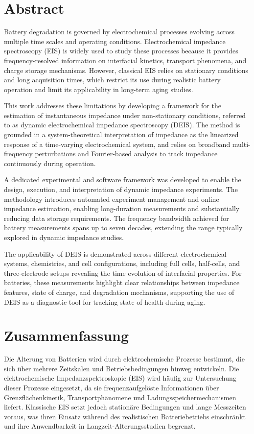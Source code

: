 \chapter*{Abstract}
Battery degradation is governed by electrochemical processes evolving across multiple time scales and operating conditions. Electrochemical impedance spectroscopy (EIS) is widely used to study these processes because it provides frequency-resolved information on interfacial kinetics, transport phenomena, and charge storage mechanisms. However, classical EIS relies on stationary conditions and long acquisition times, which restrict its use during realistic battery operation and limit its applicability in long-term aging studies.

This work addresses these limitations by developing a framework for the estimation of instantaneous impedance under non-stationary conditions, referred to as dynamic electrochemical impedance spectroscopy (DEIS). The method is grounded in a system-theoretical interpretation of impedance as the linearized response of a time-varying electrochemical system, and relies on broadband multi-frequency perturbations and Fourier-based analysis to track impedance continuously during operation.

A dedicated experimental and software framework was developed to enable the design, execution, and interpretation of dynamic impedance experiments. The methodology introduces automated experiment management and online impedance estimation, enabling long-duration measurements and substantially reducing data storage requirements. The frequency bandwidth achieved for battery measurements spans up to seven decades, extending the range typically explored in dynamic impedance studies.

The applicability of DEIS is demonstrated across different electrochemical systems, chemistries, and cell configurations, including full cells, half-cells, and three-electrode setups revealing the time evolution of interfacial properties. For batteries, these measurements highlight clear relationships between impedance features, state of charge, and degradation mechanisms, supporting the use of DEIS as a diagnostic tool for tracking state of health during aging.

\newpage
\chapter*{Zusammenfassung}
Die Alterung von Batterien wird durch elektrochemische Prozesse bestimmt, die sich über mehrere Zeitskalen und Betriebsbedingungen hinweg entwickeln. Die elektrochemische Impedanzspektroskopie (EIS) wird häufig zur Untersuchung dieser Prozesse eingesetzt, da sie frequenzaufgelöste Informationen über Grenzflächenkinetik, Transportphänomene und Ladungsspeichermechanismen liefert. Klassische EIS setzt jedoch stationäre Bedingungen und lange Messzeiten voraus, was ihren Einsatz während des realistischen Batteriebetriebs einschränkt und ihre Anwendbarkeit in Langzeit-Alterungsstudien begrenzt.

